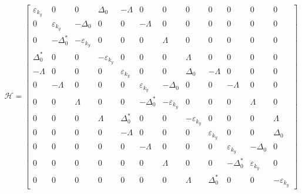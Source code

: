 \documentclass{jarticle}
\begin{document}
\begin{align}
\mathcal{H}=
 \begin{bmatrix}
	\varepsilon_{k_y} & 0 & 0 & \Delta_0 & -\Lambda & 0 & 0 & 0 & 0 & 0 & 0 & 0 \\ 
	0 & \varepsilon_{k_y} & -\Delta_0 & 0 & 0 & -\Lambda & 0 & 0 & 0 & 0 & 0 & 0 \\ 
	0 & -\Delta_0^{*} & -\varepsilon_{k_y} & 0 & 0 & 0 & \Lambda & 0 & 0 & 0 & 0 & 0 \\ 
	\Delta_0^{*} & 0 & 0 & -\varepsilon_{k_y} & 0 & 0 & 0 & \Lambda & 0 & 0 & 0 & 0 \\ 
	-\Lambda & 0 & 0 & 0 & \varepsilon_{k_y} & 0 & 0 & \Delta_0 & -\Lambda & 0 & 0 & 0 \\ 
	0 & -\Lambda & 0 & 0 & 0 & \varepsilon_{k_y} & -\Delta_0 & 0 & 0 & -\Lambda & 0 & 0 \\ 
	0 & 0 & \Lambda & 0 & 0 & -\Delta_0^{*} & -\varepsilon_{k_y} & 0 & 0 & 0 & \Lambda & 0 \\ 
	0 & 0 & 0 & \Lambda & \Delta_0^{*} & 0 & 0 & -\varepsilon_{k_y} & 0 & 0 & 0 & \Lambda \\ 
	0 & 0 & 0 & 0 & -\Lambda & 0 & 0 & 0 & \varepsilon_{k_y} & 0 & 0 & \Delta_0 \\ 
	0 & 0 & 0 & 0 & 0 & -\Lambda & 0 & 0 & 0 & \varepsilon_{k_y} & -\Delta_0 & 0 \\ 
	0 & 0 & 0 & 0 & 0 & 0 & \Lambda & 0 & 0 & -\Delta_0^{*} & \varepsilon_{k_y} & 0 \\ 
	0 & 0 & 0 & 0 & 0 & 0 & 0 & \Lambda & \Delta_0^{*} & 0 & 0 & -\varepsilon_{k_y}
 \end{bmatrix} 
\end{align}
\end{document}
